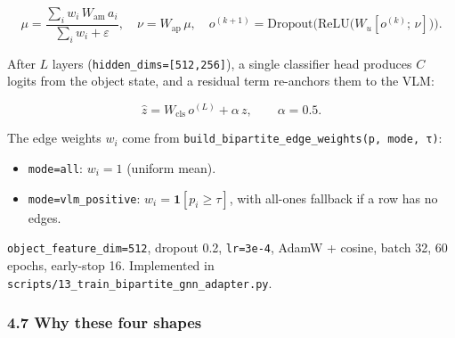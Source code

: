 \documentclass[
  11pt,
]{article}
\providecommand{\tightlist}{%
  \setlength{\itemsep}{0pt}\setlength{\parskip}{0pt}}
\begin{document}
\[\mu=\frac{\sum_i w_i\,W_{\text{am}}\, a_i}{\sum_i w_i+\varepsilon},
\quad
\nu=W_{\text{ap}}\,\mu,
\quad
o^{(k+1)}=\mathrm{Dropout}\!\bigl(\mathrm{ReLU}\!\bigl(W_u[o^{(k)};\,\nu]\bigr)\bigr).\]

After \(L\) layers (\texttt{hidden\_dims={[}512,256{]}}), a single
classifier head produces \(C\) logits from the object state, and a
residual term re-anchors them to the VLM:

\[\hat z=W_{\text{cls}}\,o^{(L)} + \alpha\,z,\qquad \alpha=0.5.\]

The edge weights \(w_i\) come from
\texttt{build\_bipartite\_edge\_weights(p,\ mode,\ τ)}:

\begin{itemize}
\tightlist
\item
  \texttt{mode=all}: \(w_i=1\) (uniform mean).
\item
  \texttt{mode=vlm\_positive}: \(w_i=\mathbf{1}[p_i\ge τ]\), with
  all-ones fallback if a row has no edges.
\end{itemize}

\texttt{object\_feature\_dim=512}, dropout 0.2, \texttt{lr=3e-4}, AdamW
+ cosine, batch 32, 60 epochs, early-stop 16. Implemented in
\texttt{scripts/13\_train\_bipartite\_gnn\_adapter.py}.

\subsubsection{4.7 Why these four shapes}\label{why-these-four-shapes}
\end{document}
